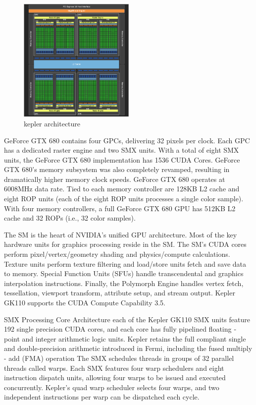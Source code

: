 \begin{figure}[h]
   \centering
       \includegraphics[width=0.5\textwidth]{kepler}
   \caption{kepler architecture}
   \label{fig:kepler arch}
\end{figure}

GeForce GTX 680 contains four GPCs, delivering 32 pixels per clock. Each GPC has a dedicated raster engine and two SMX units. With a total of eight SMX units, the GeForce GTX 680 implementation has 1536 CUDA Cores.  GeForce GTX 680’s memory subsystem was also completely revamped, resulting in dramatically higher memory clock speeds. GeForce GTX 680 operates at 6008MHz data rate. Tied to each memory controller are 128KB L2 cache and eight ROP units (each of the eight ROP units processes a single color sample). With four memory controllers, a full GeForce GTX 680 GPU has 512KB L2 cache and 32 ROPs (i.e., 32 color samples).

The SM is the heart of NVIDIA’s unified GPU architecture. Most of the key hardware units for graphics processing reside in the SM. The SM’s CUDA cores perform pixel/vertex/geometry shading and physics/compute calculations. Texture units perform texture filtering and load/store units fetch and save data to memory. Special Function Units (SFUs) handle transcendental and graphics interpolation instructions. Finally, the Polymorph Engine handles vertex fetch, tessellation, viewport transform, attribute setup, and stream output. Kepler GK110 supports the CUDA Compute Capability 3.5.

SMX Processing Core Architecture each of the Kepler GK110 SMX units feature 192 single precision CUDA cores, and each core has fully pipelined floating ‐ point and integer arithmetic logic units. Kepler retains the full compliant single and double‐precision arithmetic introduced in Fermi, including the fused multiply - add (FMA) operation
The SMX schedules threads in groups of 32 parallel threads called warps. Each SMX features four warp schedulers and eight instruction dispatch units, allowing four warps to be issued and executed concurrently. Kepler’s quad warp scheduler selects four warps, and two independent instructions per warp can be dispatched each cycle.

